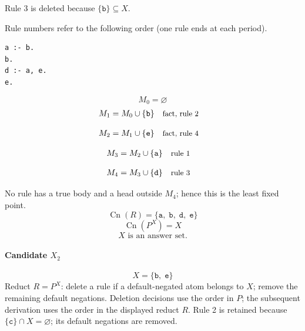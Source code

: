 \documentclass[a4paper,11pt]{article}
\newif\ifexplain
\newcommand{\explain}[1]{\ifexplain\begin{erklbox}#1\end{erklbox}\fi}
\newcommand{\why}[1]{\text{\small #1}}
\newcommand{\at}[1]{\texttt{#1}}
\begin{document}
Rule 3 is deleted because $\{\at{b}\}\subseteq X$.

Rule numbers refer to the following order (one rule ends at each period).
\begin{small}
\begin{verbatim}
a :- b.
b.
d :- a, e.
e.
\end{verbatim}
\end{small}
\explain{Beim Redukt bleibt die Kandidatenmenge fest. Wir entscheiden zuerst, welche Regeln wegfallen. Erst danach berechnen wir aus den verbleibenden positiven Regeln die kleinste abgeschlossene Menge. Ein Modell allein reicht nicht: Diese Menge muss genau der Kandidat sein.}
\[
M_0=\varnothing
\]
\begin{align*}
M_{1} &= M_{0}\cup \{\at{b}\} && \why{fact, rule 2}
\end{align*}
\explain{Diese Regel hat keinen Körper. Ihr Kopf $\at{b}$ ist damit ein Fakt und muss in die Menge.}
\begin{align*}
M_{2} &= M_{1}\cup \{\at{e}\} && \why{fact, rule 4}
\end{align*}
\explain{Diese Regel hat keinen Körper. Ihr Kopf $\at{e}$ ist damit ein Fakt und muss in die Menge.}
\begin{align*}
M_{3} &= M_{2}\cup \{\at{a}\} && \why{rule 1}
\end{align*}
\explain{Für $\at{a}$ brauchen wir $\at{b}$. Weil diese Voraussetzungen bereits hergeleitet sind, dürfen wir den Regelkopf jetzt aufnehmen und alle bisherigen Atome behalten; bei einer fehlenden Voraussetzung würde diese Regel dagegen noch nichts beitragen.}
\begin{align*}
M_{4} &= M_{3}\cup \{\at{d}\} && \why{rule 3}
\end{align*}
\explain{Für $\at{d}$ brauchen wir $\at{a}$ und $\at{e}$. Weil diese Voraussetzungen bereits hergeleitet sind, dürfen wir den Regelkopf jetzt aufnehmen und alle bisherigen Atome behalten; bei einer fehlenden Voraussetzung würde diese Regel dagegen noch nichts beitragen.}
No rule has a true body and a head outside $M_{4}$; hence this is the least fixed point.
\[
\operatorname{Cn}(R)=\{\at{a},\;\at{b},\;\at{d},\;\at{e}\}
\]
\[
\operatorname{Cn}(P^X)=X
\]
\[
\boxed{X\text{ is an answer set.}}
\]
\paragraph{Candidate $X_2$}
\[
X=\{\at{b},\;\at{e}\}
\]
Reduct $R=P^X$: delete a rule if a default-negated atom belongs to $X$; remove the remaining default negations. Deletion decisions use the order in $P$; the subsequent derivation uses the order in the displayed reduct $R$.
Rule 2 is retained because $\{\at{c}\}\cap X=\varnothing$; its default negations are removed.
\end{document}
